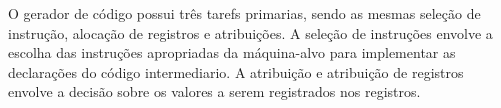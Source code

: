 \par
O gerador de código possui três tarefs primarias, sendo as mesmas seleção de instrução, alocação de registros e atribuições. A seleção de instruções envolve a escolha das instruções apropriadas da máquina-alvo para implementar as declarações do código intermediario. A atribuição e atribuição de registros envolve a decisão sobre os valores a serem registrados nos registros\cite{aho2007compilers}.
